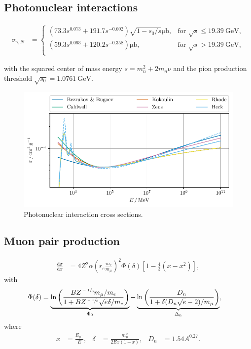 \subsection{Photonuclear interactions}


\begin{align}
	\label{eqn:photonuclear_C7}
	\sigma_{\gamma,N} &=
	\begin{cases}
		\left(73.3 s^{0.073} + 191.7 s^{-0.602} \right) \sqrt{1 - s_0 / s} \si{\micro\barn}, & \text{for } \sqrt{s} \leq \SI{19.39}{\giga\electronvolt}, \\
		\left( 59.3 s^{0.093} + 120.2 s^{-0.358} \right) \si{\micro\barn}, & \text{for } \sqrt{s} > \SI{19.39}{\giga\electronvolt}, \\
	\end{cases}
\end{align} 

with the squared center of mass energy $s = m_n^2 + 2 m_n \nu$ and the pion production threshold $\sqrt{s_0} = \SI{1.0761}{\giga\electronvolt}$.


\begin{figure}
	\centering
    \includegraphics{plots/photoproduction_cross.pdf}
    \caption{Photonuclear interaction cross sections.}
    \label{fig:photoproduction_cross}
\end{figure}


\subsection{Muon pair production}

\begin{align}
	\frac{\mathrm{d}\sigma}{\mathrm{d}x} &= 4 Z^2 \alpha \left( r_e \frac{m_e}{m_\mu} \right)^2 \Phi(\delta) \left[ 1 - \frac{4}{3} (x - x^2) \right],
\end{align}
%
with
%
\begin{align}
	\Phi(\delta) &= \underbrace{\ln \left( \frac{B Z^{\sfrac{-1}{3}} m_\mu / m_e}{1 + B Z^{\sfrac{-1}{3}} \sqrt{e} \delta / m_e } \right)}_{\Phi_0} - \underbrace{\ln\left( \frac{D_n}{1 + \delta (D_n \sqrt{e} - 2) / m_\mu} \right)}_{\Delta_\text{n}},
\end{align}
%
where
%
\begin{align}
	x &= \frac{E_{\mu^-}}{E}, & \delta &= \frac{m_\mu^2}{2 E x (1 - x)}, & D_n &= 1.54 A^{0.27}.
\end{align}
%

